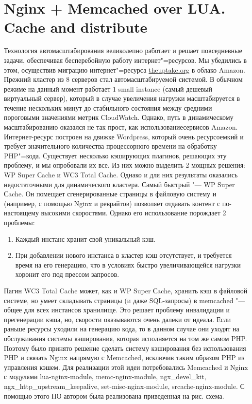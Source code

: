 \documentclass[10pt, a5paper]{article}
\begin{document}
\section*{Nginx + Memcached over LUA. Cache and distribute}

Технология автомасштабирования великолепно работает и решает повседневные задачи, обеспечивая бесперебойную работу интернет"=ресурсов. Мы убедились в этом, осуществив миграцию интернет"=ресурса \url{theuptake.org} в облако Amazon. Прежний кластер из 8 серверов стал автомасштабируемой системой. В обычном режиме на данный момент работает 1 small instance (самый дешевый виртуальный сервер), который в случае увеличения нагрузки масштабируется в течение нескольких минут до стабильного состояния между средними пороговыми значениями метрик CloudWatch. Однако, путь в динамическому масштабированию оказался не так прост, как использованиесервисов Amazon. Интернет-ресурс построен на движке Wordpress, который очень ресурсоемкий и требует значительного количества процессорного времени на обработку PHP"=кода. Существует несколько кэширующих плагинов, решающих эту проблему, и мы опробовали их все. Из них можно выделить 2 мощных решения:  WP Super Сache и WC3 Total Cache. Однако и для них результаты оказались недостаточными для динамического кластера. Самый быстрый "--- WP Super Сache. Он помещает сгенерированные страницы в файловую систему и (например, с помощью Nginx и реврайтов) позволяет отдавать контент с по-настоящему высокими скоростями. Однако его использование порождает 2 проблемы: 
\begin{enumerate}
	\item Каждый инстанс хранит свой уникальный кэш. 
	\item При добавлении нового инстанса в кластер кэш отсутствует, и требуется время на его генерацию, что в условиях быстро увеличивающейся нагрузки хоронит его под прессом запросов. 
\end{enumerate}

Пагин WC3 Total Cache может, как и WP Super Сache, хранить кэш в файловой системе, но умеет складывать страницы (и даже SQL-запросы) в memcached "--- общее для всех инстансов хранилище. Это решает проблему инвалидации и прегенерации кэша, но, скорости оказываются очень далеки от идеала. Если раньше ресурсы уходили на генерацию кода, то в данном случае они уходят на обслуживания системы кэширования, которая исполняется на том же самом PHP. Поэтому было принято решение сделать систему кэширования без использования PHP и связать Nginx напрямую с Memcached, исключив таким образом PHP из управления кэшем. Для реализации этой идеи потребовались Memcached и Nginx с модулями lua-nginx-module, memc-nginx-module, ngx\_devel\_kit,  ngx\_http\_upstream\_keepalive, set-misc-nginx-module, srcache-nginx-module. С помощью этого ПО автором была реализована приведенная на рис. схема.
\end{document}
